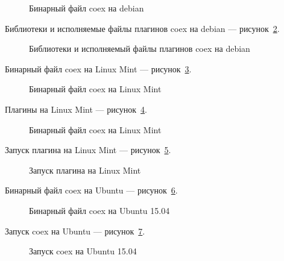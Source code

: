 \begin{figure}[h!]
\caption{ Бинарный файл coex на debian}
\label{debian:debian}
\end{figure}

Библиотеки и исполняемые файлы плагинов coex на debian --- рисунок~\ref{debian2:debian2}.

\begin{figure}[h!]
\caption{ Библиотеки и исполняемый файлы плагинов coex на debian}
\label{debian2:debian2}
\end{figure}

Бинарный файл coex на Linux Mint --- рисунок~\ref{Linux Mint:Linux Mint}.

\begin{figure}[h!]
\caption{ Бинарный файл coex на Linux Mint}
\label{Linux Mint:Linux Mint}
\end{figure}

Плагины на Linux Mint --- рисунок~\ref{Plugins:Plugins}.

\begin{figure}[h!]
\caption{ Бинарный файл coex на Linux Mint}
\label{Plugins:Plugins}
\end{figure}

Запуск плагина на Linux Mint --- рисунок~\ref{Zapusk:Zapusk}.

\begin{figure}[h!]
\caption{ Запуск плагина на Linux Mint}
\label{Zapusk:Zapusk}
\end{figure}

Бинарный файл coex на Ubuntu --- рисунок~\ref{ubuntu:ubuntu}.

\begin{figure}[h!]
\caption{ Бинарный файл coex на Ubuntu 15.04 }
\label{ubuntu:ubuntu}
\end{figure}

Запуск coex на Ubuntu --- рисунок~\ref{ubuntu2:ubuntu2}.

\begin{figure}[h!]
\caption{ Запуск coex на Ubuntu 15.04 }
\label{ubuntu2:ubuntu2}
\end{figure}

\clearpage







